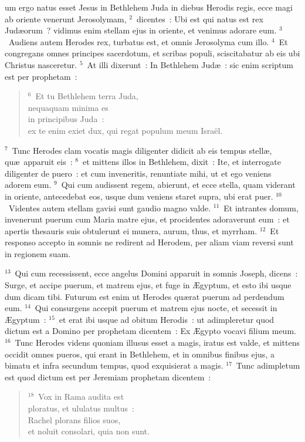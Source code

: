 \bchapter
{}um ergo natus esset Jesus in Bethlehem Juda in diebus Herodis regis, ecce magi ab oriente venerunt Jerosolymam,
${}^{2}$~dicentes~: Ubi est qui natus est rex Jud\ae orum~? vidimus enim stellam ejus in oriente, et venimus adorare eum.
${}^{3}$~Audiens autem Herodes rex, turbatus est, et omnis Jerosolyma cum illo.
${}^{4}$~Et congregans omnes principes sacerdotum, et scribas populi, sciscitabatur ab eis ubi Christus nasceretur.
${}^{5}$~At illi dixerunt~: In Bethlehem Jud\ae~: sic enim scriptum est per prophetam~:
\begin{verse}${}^{6}$~Et tu Bethlehem terra Juda,\\ nequaquam minima es\\ in principibus Juda~:\\ ex te enim exiet dux, qui regat populum meum Isra\"el.\end{verse}


${}^{7}$~Tunc Herodes clam vocatis magis diligenter didicit ab eis tempus stell\ae , qu\ae\ apparuit eis~:
${}^{8}$~et mittens illos in Bethlehem, dixit~: Ite, et interrogate diligenter de puero~: et cum inveneritis, renuntiate mihi, ut et ego veniens adorem eum.
${}^{9}$~Qui cum audissent regem, abierunt, et ecce stella, quam viderant in oriente, antecedebat eos, usque dum veniens staret supra, ubi erat puer.
${}^{10}$~Videntes autem stellam gavisi sunt gaudio magno valde.
${}^{11}$~Et intrantes domum, invenerunt puerum cum Maria matre ejus, et procidentes adoraverunt eum~: et apertis thesauris suis obtulerunt ei munera, aurum, thus, et myrrham.
${}^{12}$~Et responso accepto in somnis ne redirent ad Herodem, per aliam viam reversi sunt in regionem suam.


${}^{13}$~Qui cum recessissent, ecce angelus Domini apparuit in somnis Joseph, dicens~: Surge, et accipe puerum, et matrem ejus, et fuge in \AE gyptum, et esto ibi usque dum dicam tibi. Futurum est enim ut Herodes qu\ae rat puerum ad perdendum eum.
${}^{14}$~Qui consurgens accepit puerum et matrem ejus nocte, et secessit in \AE gyptum~:
${}^{15}$~et erat ibi usque ad obitum Herodis~: ut adimpleretur quod dictum est a Domino per prophetam dicentem~: Ex \AE gypto vocavi filium meum.
${}^{16}$~Tunc Herodes videns quoniam illusus esset a magis, iratus est valde, et mittens occidit omnes pueros, qui erant in Bethlehem, et in omnibus finibus ejus, a bimatu et infra secundum tempus, quod exquisierat a magis.
${}^{17}$~Tunc adimpletum est quod dictum est per Jeremiam prophetam dicentem~:
\begin{verse}${}^{18}$~Vox in Rama audita est\\ ploratus, et ululatus multus~:\\ Rachel plorans filios suos,\\ et noluit consolari, quia non sunt.\end{verse}


